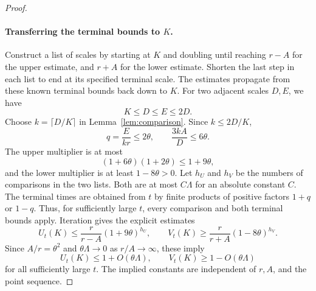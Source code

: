 \documentclass[10pt,a4paper]{amsart}
\begin{document}
\begin{proof}
\paragraph{Transferring the terminal bounds to $K$.}
Construct a list of scales by starting at $K$ and doubling until reaching
$r-A$ for the upper estimate, and $r+A$ for the lower estimate. Shorten
the last step in each list to end at its specified terminal scale.
The estimates propagate from these known terminal bounds back down to
$K$. For two adjacent scales $D,E$, we have
\[
  K\leq D\leq E\leq2D.
\]
Choose $k=\lceil D/K\rceil$ in Lemma~\ref{lem:comparison}. Since
$k\leq2D/K$,
\[
  q=\frac{E}{kr}\leq2\theta,
  \qquad
  \frac{3kA}{D}\leq6\theta.
\]
The upper multiplier is at most
\[
  (1+6\theta)(1+2\theta)\leq1+9\theta,
\]
and the lower multiplier is at least $1-8\theta>0$.
Let $h_U$ and $h_V$ be the numbers of comparisons in the two lists. Both
are at most $C\Lambda$ for an absolute constant $C$. The terminal times
are obtained from $t$ by finite products of positive factors $1+q$ or
$1-q$. Thus, for sufficiently large $t$, every comparison and both
terminal bounds apply. Iteration gives the explicit estimates
\[
  U_t(K)\leq\frac r{r-A}(1+9\theta)^{h_U},
  \qquad
  V_t(K)\geq\frac r{r+A}(1-8\theta)^{h_V}.
\]
Since $A/r=\theta^2$ and $\theta\Lambda\to0$ as $r/A\to\infty$, these
imply
\begin{equation}\label{eq:middle}
  U_t(K)\leq1+O(\theta\Lambda),
  \qquad
  V_t(K)\geq1-O(\theta\Lambda)
\end{equation}
for all sufficiently large $t$. The implied constants are independent
of $r,A$, and the point sequence.

\end{proof}
\end{document}
